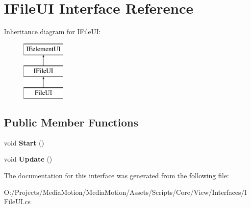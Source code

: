 \hypertarget{interface_i_file_u_i}{\section{I\+File\+U\+I Interface Reference}
\label{interface_i_file_u_i}
}
Inheritance diagram for I\+File\+U\+I\+:\begin{figure}[H]
\begin{center}
\leavevmode
\includegraphics[height=3.000000cm]{interface_i_file_u_i}
\end{center}
\end{figure}
\subsection*{Public Member Functions}
\begin{DoxyCompactItemize}
\item 
\hypertarget{interface_i_file_u_i_a70f1da3b26d079daa1de649de3ebf765}{void {\bfseries Start} ()}\label{interface_i_file_u_i_a70f1da3b26d079daa1de649de3ebf765}

\item 
\hypertarget{interface_i_file_u_i_a0b66b5f236465b5fe7fe3402ea15601a}{void {\bfseries Update} ()}\label{interface_i_file_u_i_a0b66b5f236465b5fe7fe3402ea15601a}

\end{DoxyCompactItemize}


The documentation for this interface was generated from the following file\+:\begin{DoxyCompactItemize}
\item 
O\+:/\+Projects/\+Media\+Motion/\+Media\+Motion/\+Assets/\+Scripts/\+Core/\+View/\+Interfaces/I\+File\+U\+I.\+cs\end{DoxyCompactItemize}
